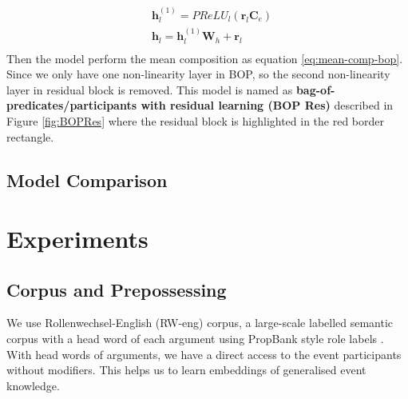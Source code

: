 \documentclass[a4paper]{article}
\begin{document}
\begin{equation} \label{eq:hidden-bopres}
\begin{aligned}
    & \mathbf{h}_l^{(1)}
        = PReLU_l(\mathbf{r}_l \mathbf{C}_e) \\
    & \mathbf{h}_{l}
        = \mathbf{h}_{l}^{(1)}\mathbf{W}_h + \mathbf{r}_l \\
\end{aligned}
\end{equation}
Then the model perform the mean composition as  equation \eqref{eq:mean-comp-bop}. Since we only have one non-linearity layer in BOP, so the second non-linearity layer in residual block is removed. This model is named as \textbf{bag-of-predicates/participants with residual learning (BOP Res)} described in Figure \ref{fig:BOPRes} where the residual block is highlighted in the red border rectangle. 


\subsection{Model Comparison} \label{sec:comp-bop}



\newpage
\section{Experiments}  \label{sec:exp}
\subsection{Corpus and Prepossessing} \label{sec:corpus}
We use Rollenwechsel-English (RW-eng) corpus, a large-scale labelled semantic corpus with a head word of each argument using PropBank style role labels \citep{SayeedEtAl2015}. With head words of arguments, we have a direct access to the event participants without modifiers. This helps us to learn embeddings of generalised event knowledge. 
\end{document}
